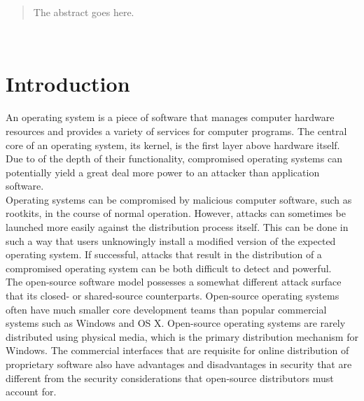 \documentclass[conference]{IEEEtran}
\begin{document}




\maketitle

\begin{abstract}
The abstract goes here.
\end{abstract}





%
\IEEEpeerreviewmaketitle\


\section{Introduction}

An operating system is a piece of software that manages computer hardware resources
and provides a variety of services for computer programs.
The central core of an operating system, its kernel, is the first layer
above hardware itself. Due to of the depth of their functionality,
compromised operating systems can potentially yield a great deal more power
to an attacker than application software.\\
\indent Operating systems can be compromised by malicious computer software,
such as rootkits, in the course of normal operation. However, attacks can sometimes
be launched more easily against the distribution process itself. This can be done in such a way
that users unknowingly install a modified version of the expected operating
system. If successful, attacks that result in the distribution of a compromised
operating system can be both difficult to detect and
powerful.\\
\indent The open-source software model possesses a somewhat different attack surface that its closed- or shared-source counterparts.
Open-source operating systems often have much smaller core development teams
than popular commercial systems such as Windows and OS X. Open-source operating systems are rarely distributed using
physical media, which is the primary distribution mechanism for Windows.
The commercial interfaces that are requisite for online distribution of proprietary
software also have advantages and disadvantages in security that
are different from the security considerations that open-source distributors must account for.
\end{document}
